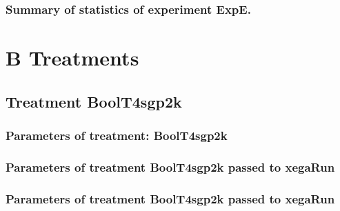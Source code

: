 \documentclass[18pt,c]{beamer}
\makeatletter
\def\beamer@writeslidentry@miniframesoff{%
  \expandafter\beamer@ifempty\expandafter{\beamer@framestartpage}{}%
  {%
   \clearpage\beamer@notesactions%
  }
}
\newcommand*{\miniframesoff}{\let\beamer@writeslidentry=\beamer@writeslidentry@miniframesoff}
\makeatother
\begin{document}
 \begin{frame}
 \fontsize{8pt}{9pt}\selectfont
 \frametitle{ Summary of statistics of experiment ExpE. }

 \label{ExpEStatsTable002.tex}  
 \end{frame}

\miniframesoff
\section{B Treatments}
\miniframesoff
\subsection{Treatment BoolT4sgp2k}

 \begin{frame}
 \fontsize{8pt}{9pt}\selectfont
 \frametitle{  Parameters of treatment: BoolT4sgp2k 
 }

 \label{ExpEtParmTable000.tex}  
 \end{frame}


 \begin{frame}
 \fontsize{8pt}{9pt}\selectfont
 \frametitle{  Parameters of treatment BoolT4sgp2k passed to xegaRun
 }

 \label{ExpEtParmTable001.tex}  
 \end{frame}


 \begin{frame}
 \fontsize{8pt}{9pt}\selectfont
 \frametitle{  Parameters of treatment BoolT4sgp2k passed to xegaRun
 }

 \label{ExpEtParmTable002.tex}  
 \end{frame}

\end{document}
